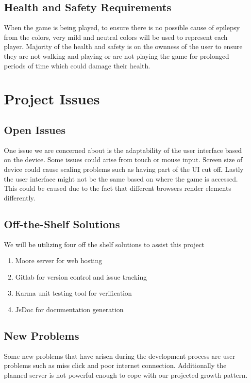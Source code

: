 \documentclass[12pt, titlepage]{article}
\begin{document}
\subsection{Health and Safety Requirements}
When the game is being played, to ensure there is no possible cause of epilepsy
from the colors, very mild and neutral colors will be used to represent each
player. Majority of the health and safety is on the ownness of the user to
ensure they are not walking and playing or are not playing the game for
prolonged periods of time which could damage their health.

\section{Project Issues}

\subsection{Open Issues}
One issue we are concerned about is the adaptability of the user interface based
on the device. Some issues could arise from touch or mouse
input. Screen size of device could cause scaling problems such as having
part of the UI cut off. Lastly the user interface might not be the same based on
where the game is accessed. This could be caused due to the fact that different 
browsers render elements differently.

\subsection{Off-the-Shelf Solutions}
We will be utilizing four off the shelf solutions to assist this project 

\begin{enumerate}
	\item Moore server for web hosting
  	\item Gitlab for version control and issue tracking 
	\item Karma unit testing tool for verification 
	\item JsDoc for documentation generation
\end{enumerate}

\subsection{New Problems}
Some new problems that have arisen during the development process are user
problems such as miss click and poor internet connection. Additionally the
planned server is not powerful enough to cope with our projected growth pattern.
\end{document}
